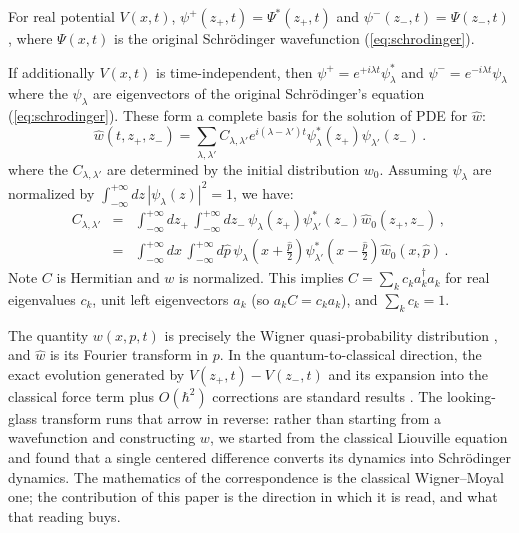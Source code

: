\documentclass[12pt]{article}
\begin{document}
For real potential $V(x,t)$, $\psi^+(z_+,t)=\Psi^*(z_+,t)$ and $\psi^-(z_-,t)=\Psi(z_-,t)$, where $\Psi(x,t)$ is the original Schr\"odinger wavefunction (\ref{eq:schrodinger}).

If additionally $V(x,t)$ is time-independent, then
$\psi^+ = e^{+i\lambda t} \psi_\lambda^*$ and $\psi^- = e^{-i\lambda t}\psi_\lambda$ where the $\psi_\lambda$ are eigenvectors
of the original Schr\"odinger's equation (\ref{eq:schrodinger}). These form a complete basis for the
solution of PDE for $\hat{w}$:
\begin{equation}
\hat{w}(t,z_+,z_-)=\sum_{\lambda,\lambda'} C_{\lambda,\lambda'} e^{i(\lambda-\lambda')t} \psi_{\lambda}^*(z_+) \psi_{\lambda'}(z_-) \,.
\end{equation}
where the $C_{\lambda,\lambda'}$ are determined by the initial distribution $w_0$.  Assuming $\psi_\lambda$ are normalized by $\int_{-\infty}^{+\infty} dz \, |\psi_\lambda(z)|^2 = 1$, we have:
\begin{eqnarray}
C_{\lambda,\lambda'} &=& \int_{-\infty}^{+\infty} dz_+ \, \int_{-\infty}^{+\infty} dz_- \, \psi_\lambda(z_+) \psi_{\lambda'}^*(z_-) \hat{w}_0(z_+,z_-) \,, \\
&=& \int_{-\infty}^{+\infty} dx \, \int_{-\infty}^{+\infty} d\hat{p} \, \psi_\lambda(x+\frac{\hat{p}}{2}) \psi_{\lambda'}^*(x-\frac{\hat{p}}{2}) \hat{w}_0(x,\hat{p}) \,.
\end{eqnarray}
Note $C$ is Hermitian and $w$ is normalized.  This implies $C=\sum_k c_k a_k^\dagger a_k$ for real eigenvalues $c_k$, unit left eigenvectors $a_k$ (so $a_k C = c_k a_k$), and $\sum_k c_k = 1$.

The quantity $w(x,p,t)$ is precisely the Wigner quasi-probability distribution \cite{wigner1932}, and $\hat{w}$ is its Fourier transform in $p$.  In the quantum-to-classical direction, the exact evolution generated by $V(z_+,t)-V(z_-,t)$ and its expansion into the classical force term plus $O(\hbar^2)$ corrections are standard results \cite{case2008,hillery1984}.  The looking-glass transform runs that arrow in reverse: rather than starting from a wavefunction and constructing $w$, we started from the classical Liouville equation and found that a single centered difference converts its dynamics into Schr\"odinger dynamics.  The mathematics of the correspondence is the classical Wigner--Moyal one; the contribution of this paper is the direction in which it is read, and what that reading buys.
\end{document}
